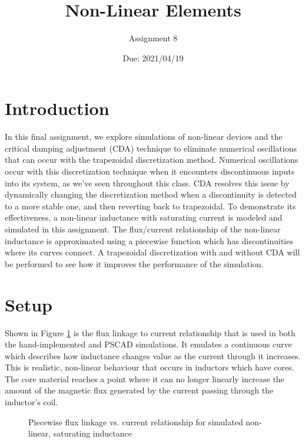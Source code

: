 \documentclass[10pt, oneside, letterpaper]{article}
\title{Non-Linear Elements}
\author{Assignment 8}
\date{Due: 2021/04/19}
\begin{document}
\maketitle
\thispagestyle{fancy}

\section{Introduction}

In this final assignment, we explore simulations of non-linear devices and the critical damping adjustment (CDA) technique to eliminate numerical oscillations that can occur with the trapezoidal discretization method. Numerical oscillations occur with this discretization technique when it encounters discontinuous inputs into its system, as we've seen throughout this class. CDA resolves this issue by dynamically changing the discretization method when a discontinuity is detected to a more stable one, and then reverting back to trapezoidal. To demonstrate its effectiveness, a non-linear inductance with saturating current is modeled and simulated in this assignment. The flux/current relationship of the non-linear inductance is approximated using a piecewise function which has discontinuities where its curves connect. A trapezoidal discretization with and without CDA will be performed to see how it improves the performance of the simulation.

\section{Setup}

Shown in Figure \ref{flux-plot} is the flux linkage to current relationship that is used in both the hand-implemented and PSCAD simulations. It emulates a continuous curve which describes how inductance changes value as the current through it increases. This is realistic, non-linear behaviour that occurs in inductors which have cores. The core material reaches a point where it can no longer linearly increase the amount of the magnetic flux generated by the current passing through the inductor's coil.

\begin{figure}[H]
  \begin{center}
    
  \end{center}
  \caption{Piecewise flux linkage vs. current relationship for simulated non-linear, saturating inductance}
  \label{flux-plot}
\end{figure}
\end{document}
